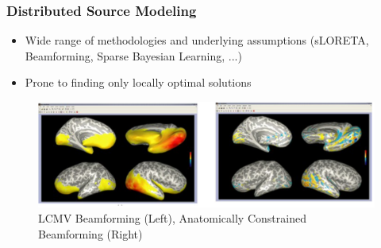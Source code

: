 \documentclass{beamer}
\begin{document}
\begin{frame}
\frametitle{Distributed Source Modeling}
\begin{itemize}
	\item Wide range of methodologies and underlying assumptions (sLORETA, Beamforming, Sparse Bayesian Learning, ...)
	\item Prone to finding only locally optimal solutions
\end{itemize}
	\begin{figure}
		\includegraphics[width=0.8\linewidth]{image/dsm2}
		\caption{LCMV Beamforming (Left), Anatomically Constrained Beamforming (Right)}
	\end{figure}
\end{frame}
\end{document}
